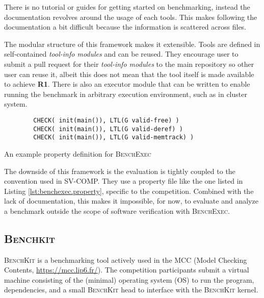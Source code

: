 There is no tutorial or guides for getting started on benchmarking, instead the documentation revolves around the usage of each tools.
This makes following the documentation a bit difficult because the information is scattered across files.

The modular structure of this framework makes it extensible.
Tools are defined in self-contained \textit{tool-info modules} and can be reused.
They encourage user to submit a pull request for their \textit{tool-info modules} to the main repository so other user can reuse it, albeit this does not mean that the tool itself is made available to achieve \textbf{R1}.
There is also an executor module that can be written to enable running the benchmark in arbitrary execution environment, such as in cluster system.

\begin{listing}
    \begin{verbatim}
        CHECK( init(main()), LTL(G valid-free) )
        CHECK( init(main()), LTL(G valid-deref) )
        CHECK( init(main()), LTL(G valid-memtrack) )
    \end{verbatim}
    \caption{An example property definition for \textsc{BenchExec}}
    \label{lst:benchexec.property}
\end{listing}

The downside of this framework is the evaluation is tightly coupled to the convention used in SV-COMP.
They use a property file like the one listed in Listing \ref{lst:benchexec.property}, specific to the competition.
Combined with the lack of documentation, this makes it impossible, for now, to evaluate and analyze a benchmark outside the scope of software verification with \textsc{BenchExec}.


\subsection{\textsc{Benchkit}}

\textsc{BenchKit} \citep{benchkit:2013} is a benchmarking tool actively used in the MCC (Model Checking Contents, \url{https://mcc.lip6.fr/}).
The competition participants submit a virtual machine consisting of the (minimal) operating system (OS) to run the program, dependencies, and a small \textsc{BenchKit} head to interface with the \textsc{BenchKit} kernel.


